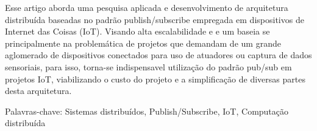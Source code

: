 \begin{resumo}
    Esse artigo aborda uma pesquisa aplicada e desenvolvimento de arquitetura distribuída baseadas no padrão publish/subscribe empregada em dispositivos de Internet das Coisas (IoT). Visando alta escalabilidade e  e um baseia se principalmente na problemática de projetos que demandam de um grande aglomerado de dispositivos conectados para uso de atuadores ou captura de dados sensoriais, para isso, torna-se indispensavel utilização do padrão pub/sub em projetos IoT, viabilizando o custo do projeto e a simplificação de diversas partes desta arquitetura.

Palavras-chave:
Sistemas distribuídos, Publish/Subscribe, IoT, Computação distribuída



\end{resumo}